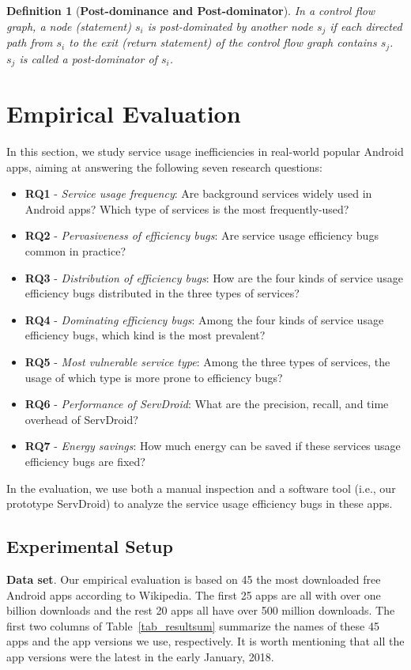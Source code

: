 \documentclass[conference]{IEEEtran}
\newtheorem{definition}{Definition}
\begin{document}
\begin{definition}[\textbf{Post-dominance and Post-dominator}]
  In a control flow graph, a node (statement) $s_i$ is post-dominated by another
  node $s_j$ if each directed path from $s_i$ to the exit (return
  statement) of the control flow graph contains $s_j$. $s_j$ is called a
  post-dominator of $s_i$.
\label{def_postdom}
\end{definition}



\section{Empirical Evaluation}\label{evaluation}
In this section, we study service usage inefficiencies in real-world popular Android apps, aiming at answering the following seven research questions:

\begin{itemize}
\item {\bf RQ1} - {\it Service usage frequency}: Are background services widely used in Android apps? Which type of services is the most frequently-used?
\item {\bf RQ2} - {\it Pervasiveness of efficiency bugs}: Are service usage efficiency bugs common in practice?
\item {\bf RQ3} - {\it Distribution of efficiency bugs}: How are the four kinds of service usage efficiency bugs distributed in the three types of services?
\item {\bf RQ4} - {\it Dominating efficiency bugs}: Among the four kinds of service usage efficiency bugs, which kind is the most prevalent?
\item {\bf RQ5} - {\it Most vulnerable service type}: Among the three types of services, the usage of which type is more prone to efficiency bugs?
\item {\bf RQ6} - {\it Performance of \textsf{ServDroid}}: What are the precision, recall, and time overhead of \textsf{ServDroid}?
\item {\bf RQ7} - {\it Energy savings}: How much energy can be saved if these services usage efficiency bugs are fixed?
\end{itemize}

In the evaluation, we use both a manual inspection and a software tool (i.e., our prototype \textsf{ServDroid}) to analyze the service usage efficiency bugs in these apps.


\subsection{Experimental Setup}
\textbf{Data set}. Our empirical evaluation is based on 45 the most downloaded free Android apps according to Wikipedia. The first 25 apps are all with over one billion downloads and the rest 20 apps all have over 500 million downloads. The first two columns of Table~\ref{tab_resultsum} summarize the names of these 45 apps and the app versions we use, respectively. It is worth mentioning that all the app versions were the latest in the early January, 2018.
\end{document}
